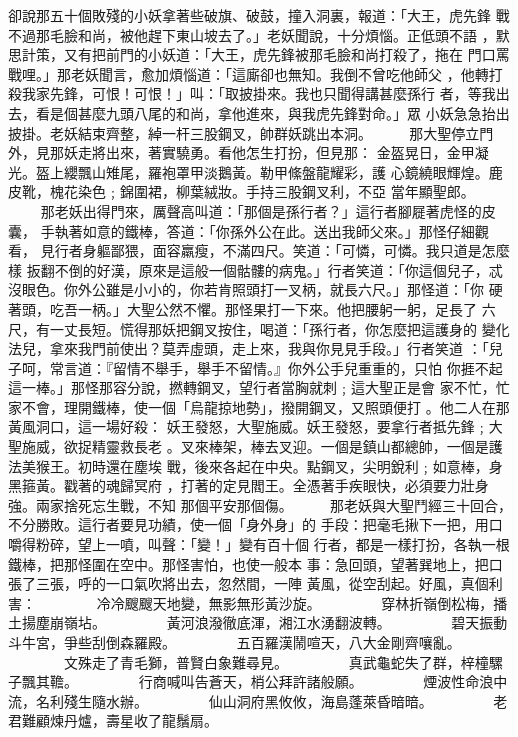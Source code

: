 \begin{pinyinscope}
{卻說那五十個敗殘的小妖拿著些破旗、破鼓，撞入洞裏，報道：「大王，虎先鋒
戰不過那毛臉和尚，被他趕下東山坡去了。」老妖聞說，十分煩惱。正低頭不語
，默思計策，又有把前門的小妖道：「大王，虎先鋒被那毛臉和尚打殺了，拖在
門口罵戰哩。」那老妖聞言，愈加煩惱道：「這廝卻也無知。我倒不曾吃他師父
，他轉打殺我家先鋒，可恨！可恨！」叫：「取披掛來。我也只聞得講甚麼孫行
者，等我出去，看是個甚麼九頭八尾的和尚，拿他進來，與我虎先鋒對命。」眾
小妖急急抬出披掛。老妖結束齊整，綽一杆三股鋼叉，帥群妖跳出本洞。
　　
那大聖停立門外，見那妖走將出來，著實驍勇。看他怎生打扮，但見那：
金盔晃日，金甲凝光。盔上纓飄山雉尾，羅袍罩甲淡鵝黃。勒甲絛盤龍耀彩，護
心鏡繞眼輝煌。鹿皮靴，槐花染色﹔錦圍裙，柳葉絨妝。手持三股鋼叉利，不亞
當年顯聖郎。
　　
那老妖出得門來，厲聲高叫道：「那個是孫行者？」這行者腳屣著虎怪的皮囊，
手執著如意的鐵棒，答道：「你孫外公在此。送出我師父來。」那怪仔細觀看，
見行者身軀鄙猥，面容羸瘦，不滿四尺。笑道：「可憐，可憐。我只道是怎麼樣
扳翻不倒的好漢，原來是這般一個骷髏的病鬼。」行者笑道：「你這個兒子，忒
沒眼色。你外公雖是小小的，你若肯照頭打一叉柄，就長六尺。」那怪道：「你
硬著頭，吃吾一柄。」大聖公然不懼。那怪果打一下來。他把腰躬一躬，足長了
六尺，有一丈長短。慌得那妖把鋼叉按住，喝道：「孫行者，你怎麼把這護身的
變化法兒，拿來我門前使出？莫弄虛頭，走上來，我與你見見手段。」行者笑道
：「兒子呵，常言道：『留情不舉手，舉手不留情。』你外公手兒重重的，只怕
你捱不起這一棒。」那怪那容分說，撚轉鋼叉，望行者當胸就刺﹔這大聖正是會
家不忙，忙家不會，理開鐵棒，使一個「烏龍掠地勢」，撥開鋼叉，又照頭便打
。他二人在那黃風洞口，這一場好殺：
妖王發怒，大聖施威。妖王發怒，要拿行者抵先鋒﹔大聖施威，欲捉精靈救長老
。叉來棒架，棒去叉迎。一個是鎮山都總帥，一個是護法美猴王。初時還在塵埃
戰，後來各起在中央。點鋼叉，尖明銳利﹔如意棒，身黑箍黃。戳著的魂歸冥府
，打著的定見閻王。全憑著手疾眼快，必須要力壯身強。兩家捨死忘生戰，不知
那個平安那個傷。
　　
那老妖與大聖鬥經三十回合，不分勝敗。這行者要見功績，使一個「身外身」的
手段：把毫毛揪下一把，用口嚼得粉碎，望上一噴，叫聲：「變！」變有百十個
行者，都是一樣打扮，各執一根鐵棒，把那怪圍在空中。那怪害怕，也使一般本
事：急回頭，望著巽地上，把口張了三張，呼的一口氣吹將出去，忽然間，一陣
黃風，從空刮起。好風，真個利害：
　　　　冷冷颼颼天地變，無影無形黃沙旋。
　　　　穿林折嶺倒松梅，播土揚塵崩嶺坫。
　　　　黃河浪潑徹底渾，湘江水湧翻波轉。
　　　　碧天振動斗牛宮，爭些刮倒森羅殿。
　　　　五百羅漢鬧喧天，八大金剛齊嚷亂。
　　　　文殊走了青毛獅，普賢白象難尋見。
　　　　真武龜蛇失了群，梓橦騾子飄其韂。
　　　　行商喊叫告蒼天，梢公拜許諸般願。
　　　　煙波性命浪中流，名利殘生隨水辦。
　　　　仙山洞府黑攸攸，海島蓬萊昏暗暗。
　　　　老君難顧煉丹爐，壽星收了龍鬚扇。
}
\end{pinyinscope}
